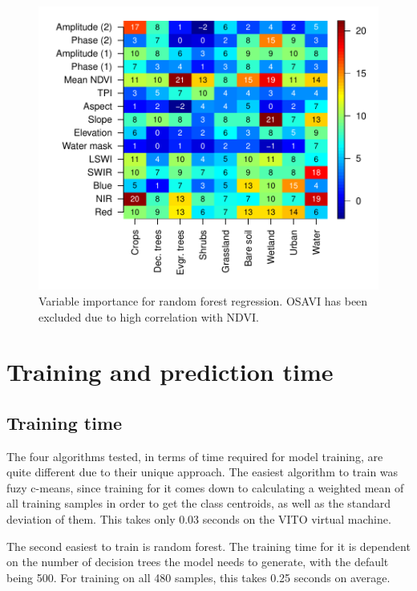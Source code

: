 \documentclass[a4paper,10pt]{book}
\begin{document}
\begin{figure}
  \centering
  \includegraphics[width=\textwidth]{../plot/variable-importance}
  \caption{Variable importance for random forest regression. OSAVI has been excluded due to high correlation with NDVI.}
  \label{fig-variable-importance}
\end{figure}

\section{Training and prediction time}

\subsection{Training time}

The four algorithms tested, in terms of time required for model training, are quite different due to their unique approach. The easiest algorithm to train was fuzy c-means, since training for it comes down to calculating a weighted mean of all training samples in order to get the class centroids, as well as the standard deviation of them. This takes only 0.03 seconds on the VITO virtual machine.

The second easiest to train is random forest. The training time for it is dependent on the number of decision trees the model needs to generate, with the default being 500. For training on all 480 samples, this takes 0.25 seconds on average.
\end{document}
